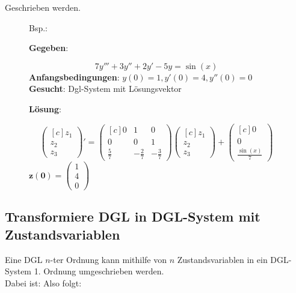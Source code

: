 \documentclass[12pt, a4paper]{scrreprt}
\begin{document}
Geschrieben werden.\\[2em]
\myhspace{}
\begin{figure}[H]
Bsp.:

\textbf{Gegeben}:

\[
  7y''' + 3y'' + 2y' - 5y = \sin(x)
\]
\textbf{Anfangsbedingungen}: \(y(0) = 1, y'(0) = 4, y''(0) = 0\)\\[2em]

\textbf{Gesucht}: Dgl-System mit Lösungsvektor

\textbf{Lösung}:

\[
  \begin{pmatrix*}[c]
    z_1\\
    z_2\\
    z_3
  \end{pmatrix*} ' =
  \begin{pmatrix*}[c]
    0 & 1 & 0\\
    0 & 0 & 1\\
    \frac{5}{7} & - \frac{2}{7} & - \frac{3}{7}
  \end{pmatrix*}
  \begin{pmatrix*}[c]
    z_1\\
    z_2\\
    z_3
  \end{pmatrix*} +
  \begin{pmatrix*}[c]
    0\\
    0\\
    \frac{\sin(x)}{7}
  \end{pmatrix*}
\]
\(\mathbf{z(0)} = \left( \begin{smallmatrix} 1 \\ 4 \\ 0 \end{smallmatrix} \right)\)
\end{figure}

\subsection{Transformiere DGL in DGL-System mit Zustandsvariablen}

Eine DGL \(n\)-ter Ordnung kann mithilfe von \(n\) Zustandsvariablen in ein DGL-System 1. Ordnung umgeschrieben werden.\\[1em]
Dabei ist: {\hskip 5.5cm} Also folgt:
\end{document}
